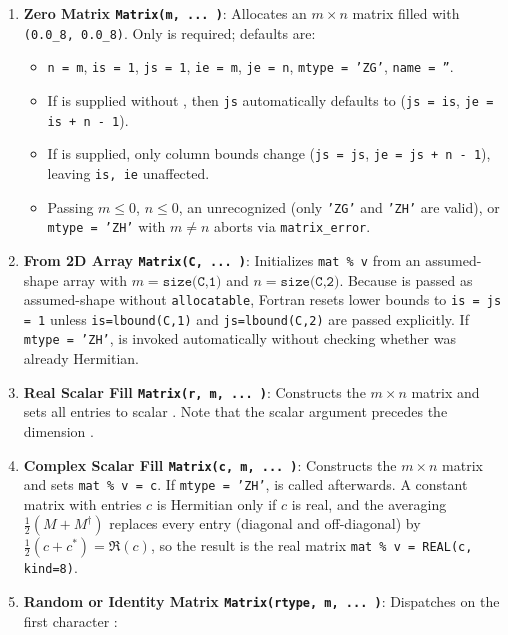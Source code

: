 \begin{enumerate}
  \item \textbf{Zero Matrix \texttt{Matrix(m, ... )}}: Allocates an $m \times n$ matrix filled with \texttt{(0.0\_8, 0.0\_8)}. Only  is required; defaults are:
  \begin{itemize}
    \item \texttt{n = m}, \texttt{is = 1}, \texttt{js = 1}, \texttt{ie = m}, \texttt{je = n}, \texttt{mtype = 'ZG'}, \texttt{name = ''}.
    \item If  is supplied without , then \texttt{js} automatically defaults to  (\texttt{js = is}, \texttt{je = is + n - 1}).
    \item If  is supplied, only column bounds change (\texttt{js = js}, \texttt{je = js + n - 1}), leaving \texttt{is, ie} unaffected.
    \item Passing $m \le 0$, $n \le 0$, an unrecognized  (only \texttt{'ZG'} and \texttt{'ZH'} are valid), or \texttt{mtype = 'ZH'} with $m \neq n$ aborts via \texttt{matrix\_error}.
  \end{itemize}
  \item \textbf{From 2D Array \texttt{Matrix(C, ... )}}: Initializes \texttt{mat \% v} from an assumed-shape  array  with $m = \texttt{size(C,1)}$ and $n = \texttt{size(C,2)}$. Because  is passed as assumed-shape without \texttt{allocatable}, Fortran resets lower bounds to \texttt{is = js = 1} unless \texttt{is=lbound(C,1)} and \texttt{js=lbound(C,2)} are passed explicitly. If \texttt{mtype = 'ZH'},  is invoked automatically without checking whether  was already Hermitian.
  \item \textbf{Real Scalar Fill \texttt{Matrix(r, m, ... )}}: Constructs the $m \times n$ matrix and sets all entries to  scalar . Note that the scalar argument precedes the dimension .
  \item \textbf{Complex Scalar Fill \texttt{Matrix(c, m, ... )}}: Constructs the $m \times n$ matrix and sets \texttt{mat \% v = c}. If \texttt{mtype = 'ZH'},  is called afterwards. A constant matrix with entries $c$ is Hermitian only if $c$ is real, and the averaging $\frac{1}{2}(M + M^\dagger)$ replaces every entry (diagonal and off-diagonal) by $\frac{1}{2}(c + c^*) = \Re(c)$, so the result is the real matrix \texttt{mat \% v = REAL(c, kind=8)}.
  \item \textbf{Random or Identity Matrix \texttt{Matrix(rtype, m, ... )}}: Dispatches on the first character :

\end{enumerate}
